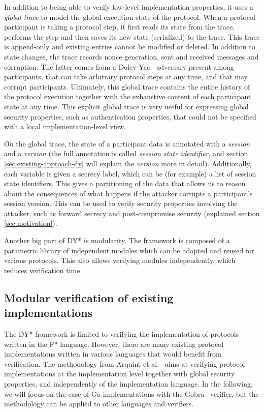 \documentclass{article}
\begin{document}
In addition to being able to verify low-level implementation properties, it uses a \textit{global trace} to model the global execution state of the protocol.
When a protocol participant is taking a protocol step, it first reads its state from the trace, performs the step and then saves its new state (serialized) to the trace. This trace is append-only and existing entries cannot be modified or deleted. In addition to state changes, the trace records nonce generation, sent and received messages and corruption. The latter comes from a Dolev-Yao~\cite{dolev1983security} adversary present among participants, that can take arbitrary protocol steps at any time, and that may corrupt participants. Ultimately, this global trace contains the entire history of the protocol execution together with the exhaustive content of each participant state at any time.
This explicit global trace is very useful for expressing global security properties, such as authentication properties, that could not be specified with a local implementation-level view.

On the global trace, the state of a participant data is annotated with a \textit{session} and a \textit{version} (the full annotation is called \textit{session state identifier}, and section \ref*{sec:existing-approach-dy} will explain the \textit{version} more in detail). 
Additionally, each variable is given a secrecy label, which can be (for example) a list of session state identifiers.
This gives a partitioning of the data that allows us to reason about the consequences of what happens if the attacker corrupts a participant's session version. This can be used to verify security properties involving the attacker, such as forward secrecy and post-compromise security (explained section \ref*{sec:motivation}).

Another big part of DY* is modularity. The framework is composed of a parametric library of independent modules which can be adapted and reused for various protocols. This also allows verifying modules independently, which reduces verification time.

\subsection{Modular verification of existing implementations}

The DY* framework is limited to verifying the implementation of protocols written in the F* language. However, there are many existing protocol implementations written in various languages that would benefit from verification. The methodology from Arquint et al.~\cite{arquint2022generic} aims at verifying protocol implementations at the implementation level together with global security properties, and independently of the implementation language. In the following, we will focus on the case of Go implementations with the Gobra~\cite{wolf2021gobra} verifier, but the methodology can be applied to other languages and verifiers.
\end{document}
